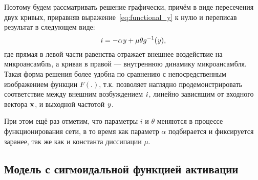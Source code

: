 Поэтому будем рассматривать решение графически, причём в виде пересечения двух кривых, приравняв выражение~\eqref{eq:functional_y} к нулю и переписав результат в следующем виде:
\begin{equation}
    \label{eq:graphic_solution}
    \mathit{i} = - \alpha \mathit{y} + \mu \theta g^{-1}(\mathit{y}),
\end{equation}
где прямая в левой части равенства отражает внешнее воздействие на микроансамбль, а кривая в правой --- внутреннюю динамику микроансамбля. Такая форма решения более удобна по сравнению с непосредственным изображением функции $F(.)$, т.к. позволяет наглядно продемонстрировать соответствие между внешним возбуждением $\mathit{i}$, линейно зависящим от входного вектора $\mathrm{\mathbf{x}}$, и выходной частотой $\mathit{y}$.

При этом ещё раз отметим, что параметры $i$ и $\theta$ меняются в процессе функционирования сети, в то время как параметр $\alpha$ подбирается и фиксируется заранее, так же как и константа диссипации $\mu$.

\subsection{Модель с сигмоидальной функцией активации}

